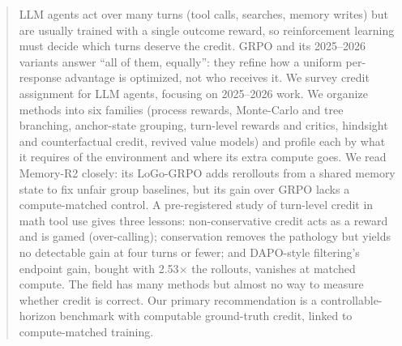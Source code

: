 \begin{abstract}
LLM agents act over many turns (tool calls, searches, memory writes) but are usually trained with a single outcome reward, so reinforcement learning must decide which turns deserve the credit. GRPO and its 2025--2026 variants answer ``all of them, equally'': they refine how a uniform per-response advantage is optimized, not who receives it. We survey credit assignment for LLM agents, focusing on 2025--2026 work. We organize methods into six families (process rewards, Monte-Carlo and tree branching, anchor-state grouping, turn-level rewards and critics, hindsight and counterfactual credit, revived value models) and profile each by what it requires of the environment and where its extra compute goes. We read Memory-R2 closely: its LoGo-GRPO adds rerollouts from a shared memory state to fix unfair group baselines, but its gain over GRPO lacks a compute-matched control. A pre-registered study of turn-level credit in math tool use gives three lessons: non-conservative credit acts as a reward and is gamed (over-calling); conservation removes the pathology but yields no detectable gain at four turns or fewer; and DAPO-style filtering's endpoint gain, bought with 2.53$\times$ the rollouts, vanishes at matched compute. The field has many methods but almost no way to measure whether credit is correct. Our primary recommendation is a controllable-horizon benchmark with computable ground-truth credit, linked to compute-matched training.
\end{abstract}
